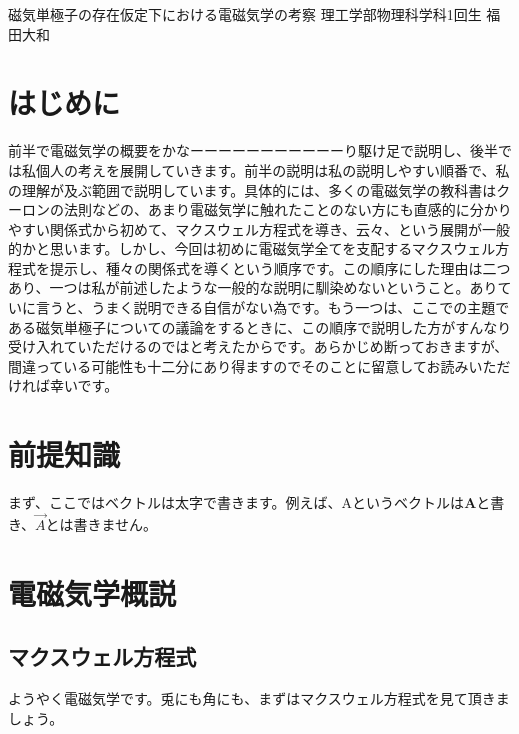 \documentclass[10pt,b5paper,papersize,dvipdfmx]{jsbook}
\begin{document}

\kaishititle%
  {磁気単極子の存在仮定下における電磁気学の考察}%
  {理工学部物理科学科1回生}%
  {福田大和}%


\section*{はじめに}
前半で電磁気学の概要をかなーーーーーーーーーーーり駆け足で説明し、後半では私個人の考えを展開していきます。前半の説明は私の説明しやすい順番で、私の理解が及ぶ範囲で説明しています。具体的には、多くの電磁気学の教科書はクーロンの法則などの、あまり電磁気学に触れたことのない方にも直感的に分かりやすい関係式から初めて、マクスウェル方程式を導き、云々、という展開が一般的かと思います。しかし、今回は初めに電磁気学全てを支配するマクスウェル方程式を提示し、種々の関係式を導くという順序です。この順序にした理由は二つあり、一つは私が前述したような一般的な説明に馴染めないということ。ありていに言うと、うまく説明できる自信がない為です。もう一つは、ここでの主題である磁気単極子についての議論をするときに、この順序で説明した方がすんなり受け入れていただけるのではと考えたからです。あらかじめ断っておきますが、間違っている可能性も十二分にあり得ますのでそのことに留意してお読みいただければ幸いです。

\section{前提知識}
まず、ここではベクトルは太字で書きます。例えば、Aというベクトルは$\mathbf{A}$と書き、$\vec{A}$とは書きません。

\section{電磁気学概説}
\subsection{マクスウェル方程式}
ようやく電磁気学です。兎にも角にも、まずはマクスウェル方程式を見て頂きましょう。
\end{document}
